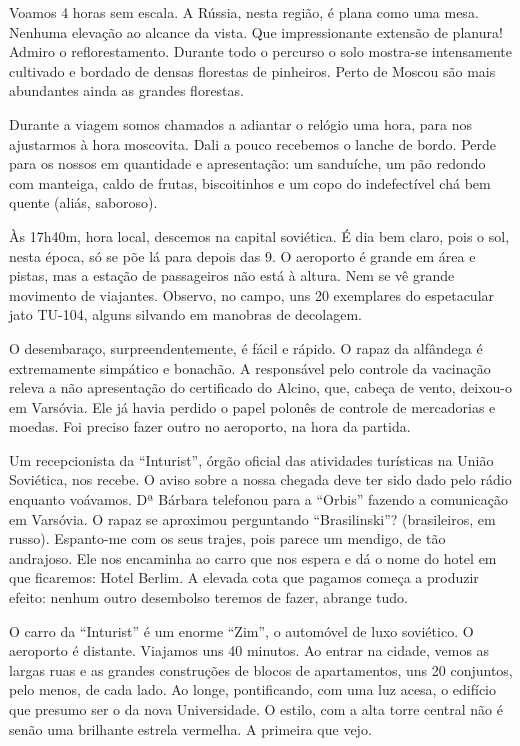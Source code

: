 Voamos 4 horas sem escala. A Rússia, nesta região, é plana como uma mesa. Nenhuma elevação ao alcance da vista. Que impressionante extensão de planura! Admiro o reflorestamento. Durante todo o percurso o solo mostra-se intensamente cultivado e bordado de densas florestas de pinheiros. Perto de Moscou são mais abundantes ainda as grandes florestas.

Durante a viagem somos chamados a adiantar o relógio uma hora, para nos ajustarmos à hora moscovita. Dali a pouco recebemos o lanche de bordo. Perde para os nossos em quantidade e apresentação: um sanduíche, um pão redondo com manteiga, caldo de frutas, biscoitinhos e um copo do indefectível chá bem quente (aliás, saboroso).

Às 17h40m, hora local, descemos na capital soviética. É dia bem claro, pois o sol, nesta época, só se põe lá para depois das 9. O aeroporto é grande em área e pistas, mas a estação de passageiros não está à altura. Nem se vê grande movimento de viajantes. Observo, no campo, uns 20 exemplares do espetacular jato TU-104, alguns silvando em manobras de decolagem.

O desembaraço, surpreendentemente, é fácil e rápido. O rapaz da alfândega é extremamente simpático e bonachão. A responsável pelo controle da vacinação releva a não apresentação do certificado do Alcino, que, cabeça de vento, deixou-o em Varsóvia. Ele já havia perdido o papel polonês de controle de mercadorias e moedas. Foi preciso fazer outro no aeroporto, na hora da partida.

Um recepcionista da “Inturist”, órgão oficial das atividades turísticas na União Soviética, nos recebe. O aviso sobre a nossa chegada deve ter sido dado pelo rádio enquanto voávamos. Dª Bárbara telefonou para a “Orbis” fazendo a comunicação em Varsóvia. O rapaz se aproximou perguntando “Brasilinski”? (brasileiros, em russo). Espanto-me com os seus trajes, pois parece um mendigo, de tão andrajoso. Ele nos encaminha ao carro que nos espera e dá o nome do hotel em que ficaremos: Hotel Berlim. A elevada cota que pagamos começa a produzir efeito: nenhum outro desembolso teremos de fazer, abrange tudo.

O carro da “Inturist” é um enorme “Zim”, o automóvel de luxo soviético. O aeroporto é distante. Viajamos uns 40 minutos. Ao entrar na cidade, vemos as largas ruas e as grandes construções de blocos de apartamentos, uns 20 conjuntos, pelo menos, de cada lado. Ao longe, pontificando, com uma luz acesa, o edifício que presumo ser o da nova Universidade. O estilo, com a alta torre central não é senão uma brilhante estrela vermelha. A primeira que vejo.

